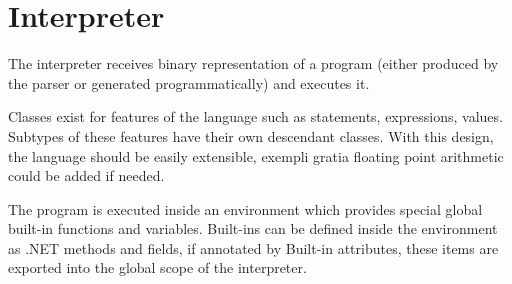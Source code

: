 \documentclass[a4paper,11pt,openany]{article}
\begin{document}
\section*{Interpreter}

The interpreter receives binary representation of a program (either produced by the parser or generated programmatically) and executes it.

Classes exist for features of the language such as statements, expressions, values. Subtypes of these features have their own descendant classes. With this design, the language should be easily extensible, exempli gratia floating point arithmetic could be added if needed.

The program is executed inside an environment which provides special global built-in functions and variables. Built-ins can be defined inside the environment as .NET methods and fields, if annotated by Built-in attributes, these items are exported into the global scope of the interpreter.
\end{document}
